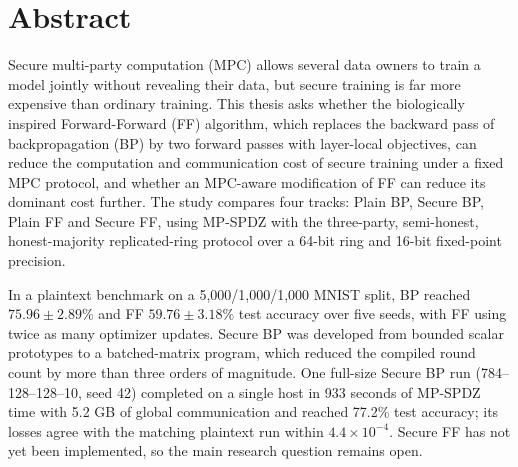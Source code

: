 \chapter*{Abstract}
\label{chap:abstract}
Secure multi-party computation (MPC) allows several data owners to train a model jointly without revealing their data, but secure training is far more expensive than ordinary training. This thesis asks whether the biologically inspired Forward-Forward (FF) algorithm, which replaces the backward pass of backpropagation (BP) by two forward passes with layer-local objectives, can reduce the computation and communication cost of secure training under a fixed MPC protocol, and whether an MPC-aware modification of FF can reduce its dominant cost further. The study compares four tracks: Plain BP, Secure BP, Plain FF and Secure FF, using MP-SPDZ with the three-party, semi-honest, honest-majority replicated-ring protocol over a 64-bit ring and 16-bit fixed-point precision.

In a plaintext benchmark on a 5,000/1,000/1,000 MNIST split, BP reached $75.96\pm2.89\%$ and FF $59.76\pm3.18\%$ test accuracy over five seeds, with FF using twice as many optimizer updates. Secure BP was developed from bounded scalar prototypes to a batched-matrix program, which reduced the compiled round count by more than three orders of magnitude. One full-size Secure BP run (784--128--128--10, seed 42) completed on a single host in 933 seconds of MP-SPDZ time with 5.2 GB of global communication and reached 77.2\% test accuracy; its losses agree with the matching plaintext run within $4.4\times10^{-4}$. Secure FF has not yet been implemented, so the main research question remains open.

